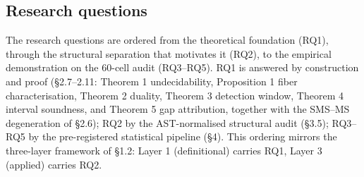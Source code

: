 \documentclass[manuscript,screen,review]{acmart}
\begin{document}
\subsection{Research questions}\label{research-questions}

The research questions are ordered from the theoretical foundation
(RQ1), through the structural separation that motivates it (RQ2), to the
empirical demonstration on the 60-cell audit (RQ3--RQ5). RQ1 is answered
by construction and proof (§2.7--2.11: Theorem 1 undecidability,
Proposition 1 fiber characterisation, Theorem 2 duality, Theorem 3
detection window, Theorem 4 interval soundness, and Theorem 5 gap
attribution, together with the SMS--MS degeneration of §2.6); RQ2 by the
AST-normalised structural audit (§3.5); RQ3--RQ5 by the pre-registered
statistical pipeline (§4). This ordering mirrors the three-layer
framework of §1.2: Layer 1 (definitional) carries RQ1, Layer 3 (applied)
carries RQ2.
\end{document}
